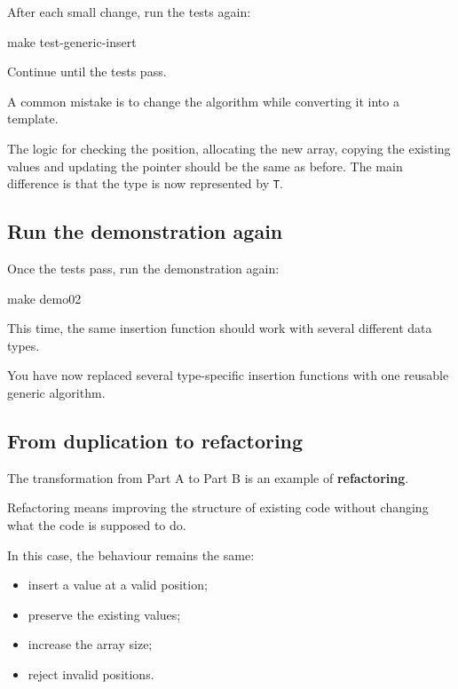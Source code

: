 \documentclass{csc2059practical}
\begin{document}
After each small change, run the tests again:

\begin{terminal}
make test-generic-insert
\end{terminal}

Continue until the tests pass.

\begin{commonerror}
A common mistake is to change the algorithm while converting it into a template.

The logic for checking the position, allocating the new array, copying the existing values and updating the pointer should be the same as before. The main difference is that the type is now represented by \texttt{T}.
\end{commonerror}

\subsection{Run the demonstration again}

Once the tests pass, run the demonstration again:

\begin{terminal}
make demo02
\end{terminal}

This time, the same insertion function should work with several different data types.

You have now replaced several type-specific insertion functions with one reusable generic algorithm.

\subsection{From duplication to refactoring}

The transformation from Part A to Part B is an example of \textbf{refactoring}.

Refactoring means improving the structure of existing code without changing what the code is supposed to do.

In this case, the behaviour remains the same:

\begin{itemize}
    \item insert a value at a valid position;
    \item preserve the existing values;
    \item increase the array size;
    \item reject invalid positions.
\end{itemize}
\end{document}
